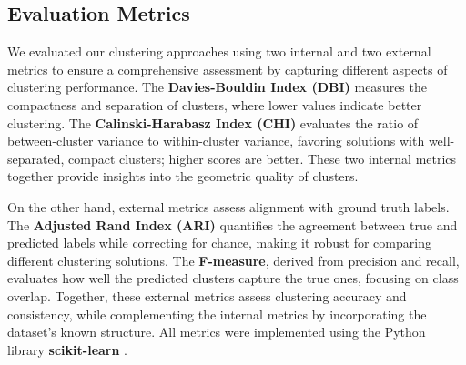 \subsection{Evaluation Metrics}
\label{subsec:methods-evaluation-metrics}

We evaluated our clustering approaches using two internal and two external metrics to ensure a comprehensive assessment by capturing different aspects of clustering performance. The \textbf{Davies-Bouldin Index (DBI)} measures the compactness and separation of clusters, where lower values indicate better clustering. The \textbf{Calinski-Harabasz Index (CHI)} evaluates the ratio of between-cluster variance to within-cluster variance, favoring solutions with well-separated, compact clusters; higher scores are better. These two internal metrics together provide insights into the geometric quality of clusters.

On the other hand, external metrics assess alignment with ground truth labels. The \textbf{Adjusted Rand Index (ARI)} quantifies the agreement between true and predicted labels while correcting for chance, making it robust for comparing different clustering solutions. The \textbf{F-measure}, derived from precision and recall, evaluates how well the predicted clusters capture the true ones, focusing on class overlap. Together, these external metrics assess clustering accuracy and consistency, while complementing the internal metrics by incorporating the dataset’s known structure. All metrics were implemented using the Python library \textbf{scikit-learn} \cite{scikit-learn}.

